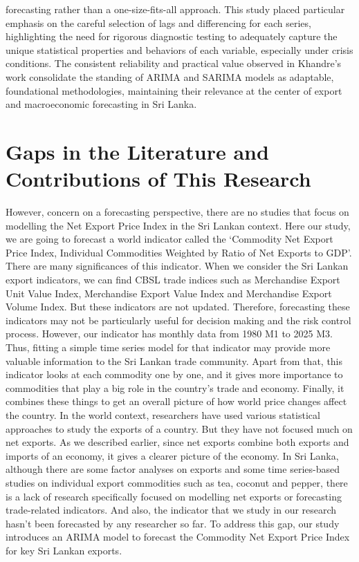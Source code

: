 \documentclass[12pt,a4paper]{report} %
\begin{document}
forecasting rather than a one-size-fits-all approach. This study placed particular emphasis on the careful selection of lags and differencing for each series, highlighting the need for rigorous diagnostic testing to adequately capture the unique statistical properties and behaviors of each variable, especially under crisis conditions. The consistent reliability and practical value observed in Khandre’s work consolidate the standing of ARIMA and SARIMA models as adaptable, foundational methodologies, maintaining their relevance at the center of export and macroeconomic forecasting in Sri Lanka. 
	
	\section{Gaps in the Literature and Contributions of This Research}
	
	However, concern on a forecasting perspective, there are no studies that focus on modelling the Net Export Price Index in the Sri Lankan context. Here our study, we are going to forecast a world indicator called the `Commodity Net Export Price Index, Individual Commodities Weighted by Ratio of Net Exports to GDP'. There are many significances of this indicator. When we consider the Sri Lankan export indicators, we can find CBSL trade indices such as Merchandise Export Unit Value Index, Merchandise Export Value Index and Merchandise Export Volume Index. But these indicators are not updated. Therefore, forecasting these indicators may not be particularly useful for decision making and the risk control process. However, our indicator has monthly data from 1980 M1 to 2025 M3. Thus, fitting a simple time series model for that indicator may provide more valuable information to the Sri Lankan trade community. Apart from that, this indicator looks at each commodity one by one, and it gives more importance to commodities that play a big role in the country’s trade and economy. Finally, it combines these things to get an overall picture of how world price changes affect the country. In the world context, researchers have used various statistical approaches to study the exports of a country. But they have not focused much on net exports. As we described earlier, since net exports combine both exports and imports of an economy, it gives a clearer picture of the economy. In Sri Lanka, although there are some factor analyses on exports and some time series-based studies on individual export commodities such as tea, coconut and pepper, there is a lack of research specifically focused on modelling net exports or forecasting trade-related indicators. And also, the indicator that we study in our research hasn’t been forecasted by any researcher so far. To address this gap, our study introduces an ARIMA model to forecast the Commodity Net Export Price Index for key Sri Lankan exports.
\end{document}
